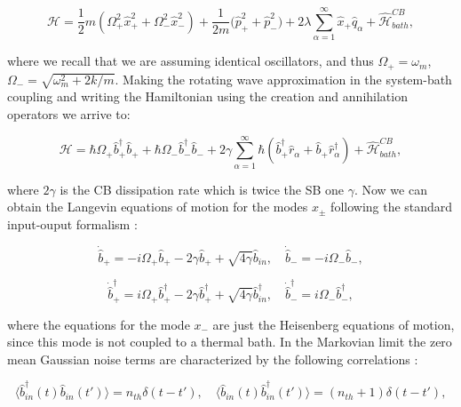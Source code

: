 \documentclass[a4paper]{jpconf}
\begin{document}
\begin{equation}
\mathcal{H}=\frac{1}{2}m(\Omega_+^2\hat{x}_+^2+\Omega_-^2\hat{x}_-^2)+\frac{1}{2m}\big(\hat{p}_+^2+\hat{p}_-^2 \big)+2\lambda\sum_{\alpha=1}
^{\infty}\hat{x}_+\hat{q}_\alpha+\hat{\mathcal{H}}^{CB}_{bath},\label{A.1}
\end{equation}

\noindent where we recall that we are assuming identical oscillators, and thus $\Omega_+=\omega_m$, $\Omega_-=\sqrt{\omega_m^2+2k/m}$. Making the rotating 
wave approximation in the system-bath coupling and writing the Hamiltonian using the creation and annihilation operators we arrive to:

\begin{equation}
\mathcal{H}=\hbar\Omega_+ \hat{b}_+^\dagger\hat{b}_++\hbar\Omega_- \hat{b}_-^\dagger\hat{b}_-+2\gamma\sum_{\alpha=1}
^{\infty}\hbar(\hat{b}_+^\dagger\hat{r}_\alpha+\hat{b}_+\hat{r}_\alpha^\dagger)+\hat{\mathcal{H}}^{CB}_{bath},\label{A.2}
\end{equation}

\noindent where $2\gamma$ is the CB dissipation rate which is twice the SB one $\gamma$. Now we can obtain the Langevin equations of motion for the modes $x_\pm$ following the 
standard input-ouput formalism \cite{62}:

\begin{equation}
\dot{\hat{b}}_+=-i\Omega_+\hat{b}_+-2\gamma\hat{b}_+ +\sqrt{4\gamma}\hat{b}_{in},\quad \dot{\hat{b}}_-=-i\Omega_-\hat{b}_-,\label{A.3}
\end{equation}

\begin{equation}
\dot{\hat{b}}^\dagger_+=i\Omega_+\hat{b}_+^\dagger-2\gamma\hat{b}_+^\dagger
+\sqrt{4\gamma}\hat{b}_{in}^\dagger,\quad \dot{\hat{b}}^\dagger_-=i\Omega_-\hat{b}_-^\dagger,\label{A.4}
\end{equation} 

\noindent where the equations for the mode $x_-$ are just the Heisenberg equations of motion, since this mode is not coupled to a thermal bath. In the Markovian limit the 
zero mean Gaussian noise terms are characterized by the following correlations \cite{22}:

\begin{equation}
\langle  \hat{b}_{in}^\dagger(t)\hat{b}_{in}(t')\rangle=n_{th}\delta(t-t') ,\quad \langle  \hat{b}_{in}(t)\hat{b}^\dagger_{in}(t')\rangle=(n_{th}+1)\delta(t-t'),\label{A.5}
\end{equation}
\end{document}
